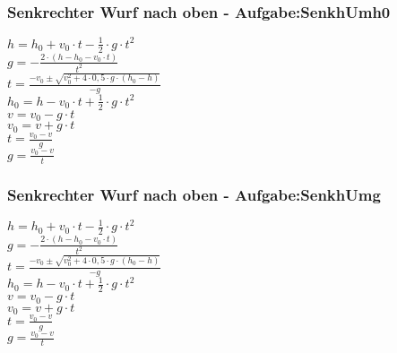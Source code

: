 \subsubsection{Senkrechter Wurf nach oben  - Aufgabe:SenkhUmh0} 
\begin{minipage}{0.45\textwidth} 
$ h = h_{0}  + v_{0} \cdot t - \frac{1}{2}\cdot g\cdot t^{2} $\\ 
$ g = - \frac{2\cdot (h - h_{0}  - v_{0} \cdot t)}{     t^{2} } $\\ 
$ t = \frac{-v_{0}  \pm \sqrt{v_{0} ^{2} +4\cdot 0,5\cdot g\cdot (h_{0}  -h)}}{      -g} $\\ 
$ h_{0}  = h - v_{0} \cdot t + \frac{1}{2}\cdot g\cdot t^{2} $\\ 
$ v = v_{0}  - g\cdot t $\\ 
$ v_{0}  = v + g\cdot t $\\ 
$ t = \frac{v_{0} -v}{  g} $\\ 
$ g = \frac{v_{0}  - v}{  t} $\\ 
\end{minipage} 
\begin{minipage}{0.45\textwidth} 
 
\end{minipage} 
\subsubsection{Senkrechter Wurf nach oben  - Aufgabe:SenkhUmg} 
\begin{minipage}{0.45\textwidth} 
$ h = h_{0}  + v_{0} \cdot t - \frac{1}{2}\cdot g\cdot t^{2} $\\ 
$ g = - \frac{2\cdot (h - h_{0}  - v_{0} \cdot t)}{     t^{2} } $\\ 
$ t = \frac{-v_{0}  \pm \sqrt{v_{0} ^{2} +4\cdot 0,5\cdot g\cdot (h_{0}  -h)}}{      -g} $\\ 
$ h_{0}  = h - v_{0} \cdot t + \frac{1}{2}\cdot g\cdot t^{2} $\\ 
$ v = v_{0}  - g\cdot t $\\ 
$ v_{0}  = v + g\cdot t $\\ 
$ t = \frac{v_{0} -v}{  g} $\\ 
$ g = \frac{v_{0}  - v}{  t} $\\ 
\end{minipage} 
\begin{minipage}{0.45\textwidth} 
 
\end{minipage} 
